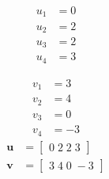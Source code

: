 \[\begin{aligned}
u_{1} &= 0 \\
u_{2} &= 2 \\
u_{3} &= 2 \\
u_{4} &= 3 
\end{aligned}\]

\[\begin{aligned}
v_{1} &= 3 \\
v_{2} &= 4 \\
v_{3} &= 0 \\
v_{4} &= -3 
\end{aligned}\]
\[\begin{aligned}
\mathbf{u} &= \begin{bmatrix}0\;2\;2\;3\end{bmatrix} \\
\mathbf{v} &= \begin{bmatrix}3\;4\;0\;-3\end{bmatrix}
\end{aligned}\]

